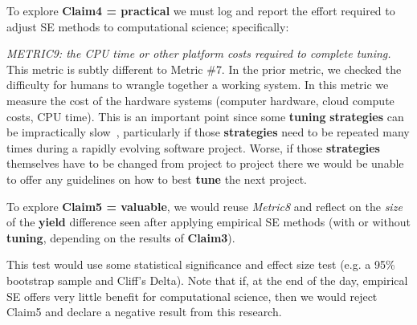 To explore {\bf Claim4 = practical}
we must log and report the effort required to 
adjust SE methods to computational science; specifically:
\bi
\item {\em METRIC9: the CPU time or other platform  costs
required to complete tuning.}
\ei
This metric is subtly different to Metric \#7. In the prior metric, we checked
the difficulty for humans to wrangle together a working system. In this metric we 
measure the cost of the hardware systems (computer hardware,  cloud compute costs, CPU time).
This is an important point since some {\bf tuning}
{\bf strategies}
can be impractically slow~\cite{abs-1807-11112},
particularly if those {\bf strategies} need to be repeated
many times during a rapidly evolving software project.
Worse, if those {\bf strategies} themselves have
to be changed from project to project there we
would be unable to offer any guidelines on how to best
{\bf tune} the next project.

To explore  {\bf Claim5 = valuable}, we would reuse
{\em Metric8} and reflect on the 
  {\em size} of the {\bf yield} difference seen after
  applying empirical SE methods (with or without
  {\bf tuning}, depending on the results of {\bf Claim3}).
  \bi
  \item
  This test would use some statistical significance and
  effect size test (e.g. a 95\% bootstrap sample and Cliff's Delta).
  \ei
  Note that if,
  at the end of the day, empirical SE offers very
  little benefit for computational  science, then we would reject Claim5 and declare
  a negative result from this research.
  
  